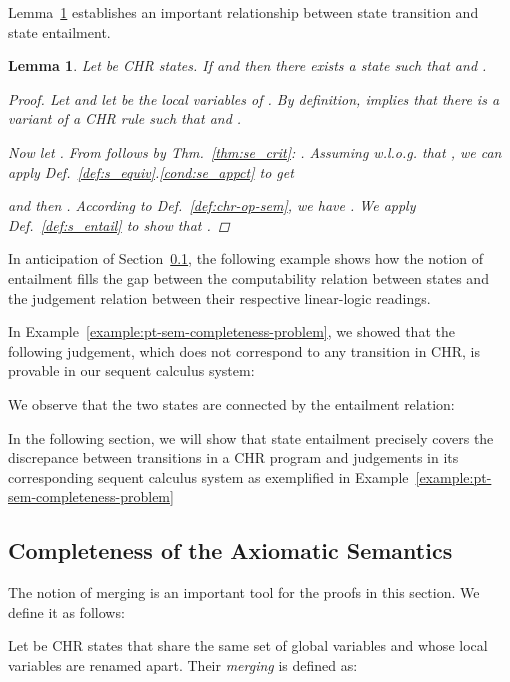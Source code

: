 \documentclass[acmtocl]{acmtrans2m}
\newtheorem{lemma}[theorem]{Lemma}
\begin{document}
Lemma~\ref{lemma:exchange} establishes an important relationship between state transition and state entailment.

\begin{lemma}\label{lemma:exchange}
  Let  be CHR states. If  and  then there exists a state  such that
   and .

\begin{proof}
 Let  and
let  be the
    local variables of .
  By definition,  implies that there is a variant of a CHR rule
 such that
     and
    .

  Now let .
  From  follows by Thm.~\ref{thm:se_crit}:
    .
  Assuming w.l.o.g. that , we can apply
Def.~\ref{def:s_equiv}.\ref{cond:se_appct} to get
    
  and then
    .
  According to Def.~\ref{def:chr-op-sem}, we have . We apply
Def.~\ref{def:s_entail} to show that .
\end{proof}
\end{lemma}

In anticipation of Section~\ref{sec:pt-completeness}, the following example shows
how the notion of entailment fills the gap between the computability
relation between states and the judgement relation between their
respective linear-logic readings.

\begin{example}
	\label{example:pt-sem-entailment}
In Example~\ref{example:pt-sem-completeness-problem}, we showed that the
following judgement, which does not correspond to any transition in CHR, is
 provable in our sequent calculus system:

We observe that the two states are connected by the entailment
relation:

In the following section, we will show that state entailment precisely covers
the discrepance between transitions in a CHR
program and judgements in its corresponding sequent
calculus system as exemplified in
Example~\ref{example:pt-sem-completeness-problem}
\end{example}

\subsection{Completeness of the Axiomatic Semantics}
	\label{sec:pt-completeness}

The notion of merging is an important tool for the proofs in this section. We
define it as follows:

\begin{definition}[()]
	\label{def:merging}
  Let  be CHR
  states that share the same set of global variables and whose local variables
  are renamed apart. Their \emph{merging} is defined as:
  
\end{definition}
\end{document}
